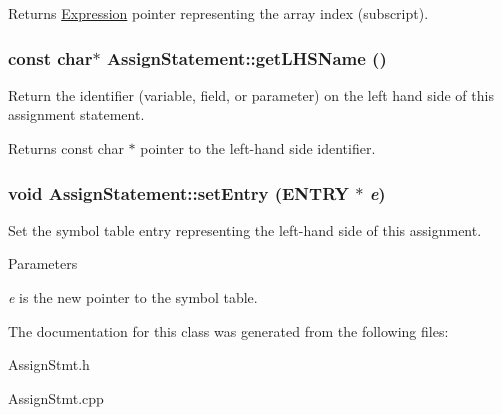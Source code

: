 \begin{DoxyReturn}{Returns}
\hyperlink{classExpression}{Expression} pointer representing the array index (subscript). 
\end{DoxyReturn}
\hypertarget{classAssignStatement_a9c6b348f0bcd4ca190414710ddeb085f}{
\subsubsection[{getLHSName}]{\setlength{\rightskip}{0pt plus 5cm}const char$\ast$ AssignStatement::getLHSName ()}}
\label{classAssignStatement_a9c6b348f0bcd4ca190414710ddeb085f}
Return the identifier (variable, field, or parameter) on the left hand side of this assignment statement. \begin{DoxyReturn}{Returns}
const char $\ast$ pointer to the left-\/hand side identifier. 
\end{DoxyReturn}
\hypertarget{classAssignStatement_a8a0b32169f7557553d24582f5b893ba2}{
\subsubsection[{setEntry}]{\setlength{\rightskip}{0pt plus 5cm}void AssignStatement::setEntry (ENTRY $\ast$ {\em e})}}
\label{classAssignStatement_a8a0b32169f7557553d24582f5b893ba2}
Set the symbol table entry representing the left-\/hand side of this assignment.


\begin{DoxyParams}{Parameters}
\item[{\em e}]is the new pointer to the symbol table. \end{DoxyParams}


The documentation for this class was generated from the following files:\begin{DoxyCompactItemize}
\item 
AssignStmt.h\item 
AssignStmt.cpp\end{DoxyCompactItemize}
